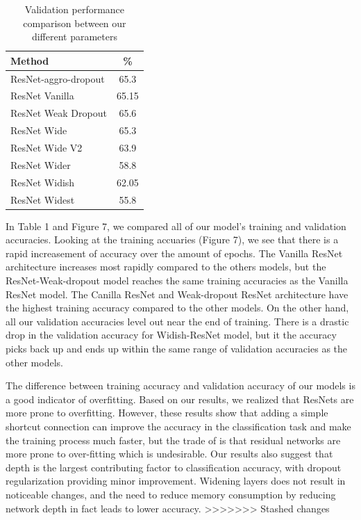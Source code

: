 \documentclass[10pt,twocolumn,letterpaper]{article}
\begin{document}
\begin{table}[h]
\begin{center}
\begin{tabular}{|l|c|}
\hline
Method & \% \\
\hline\hline
ResNet-aggro-dropout &  65.3 \\
ResNet Vanilla & 65.15 \\
ResNet Weak Dropout & 65.6\\
ResNet Wide &  65.3\\ 
ResNet  Wide V2 & 63.9\\
ResNet Wider  &  58.8\\
ResNet Widish  & 62.05\\ 
ResNet Widest &  55.8\\
\hline
\end{tabular}
\end{center}
\caption{Validation performance comparison between our different parameters}
\end{table}

In Table 1 and Figure 7, we compared all of our model's training and validation accuracies. Looking at the training accuaries (Figure 7), we see that there is a rapid increasement of accuracy over the amount of epochs. The Vanilla ResNet architecture increases most rapidly compared to the others models, but the ResNet-Weak-dropout model reaches the same training accuracies as the Vanilla ResNet model. The Canilla ResNet and Weak-dropout ResNet architecture have the highest training accuracy compared to the other models. On the other hand, all our validation accuracies level out near the end of training. There is a drastic drop in the validation accuracy for Widish-ResNet model, but it the accuracy picks back up and ends up within the same range of validation accuracies as the other models. 

The difference between training accuracy and validation accuracy of our models is a good indicator of overfitting. Based on our results, we realized that ResNets are more prone to overfitting. However, these results show that adding a simple shortcut connection can improve the accuracy in the classification task and make the training process much faster, but  the trade of is that residual networks are more prone to over-fitting which is undesirable. Our results also suggest that depth is the largest contributing factor to classification accuracy, with dropout regularization providing minor improvement. Widening layers does not result in noticeable changes, and the need to reduce memory consumption by reducing network depth in fact leads to lower accuracy. 
>>>>>>> Stashed changes
\end{document}

